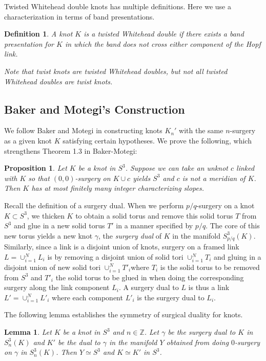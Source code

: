 \documentclass[11pt,usenames,dvipsnames,reqno]{amsart}
\numberwithin{theorem}{section}
\newtheorem{lemma}[theorem]{Lemma}
\newtheorem{proposition}[theorem]{Proposition}
\theoremstyle{ex}
\newtheorem{definition}[theorem]{Definition}
\theoremstyle{rem}
\begin{document}
Twisted Whitehead double knots has multiple definitions. Here we use a characterization in terms of band presentations.

\begin{definition} A knot $K$ is a \textit{twisted Whitehead double} if there exists a band presentation for $K$ in which the band does not cross either component of the Hopf link.
	
Note that twist knots are twisted Whitehead doubles, but not all twisted Whitehead doubles are twist knots.

\end{definition}

\subsection{Baker and Motegi's Construction} We follow Baker and Motegi \cite{baker-motegi} in constructing knots $K_n'$ with the same $n$-surgery as a given knot $K$ satisfying certain hypotheses. We prove the following, which strengthens Theorem 1.3 in Baker-Motegi:

\begin{proposition}\label{prop 2.3}
	Let $K$ be a knot in $S^3$. Suppose we can take an unknot $c$ linked with $K$ so that $(0,0)$-surgery on $K\cup c$ yields $S^3$ and $c$ is not a meridian of $K$. Then $K$ has at most finitely many integer characterizing slopes.
\end{proposition}

Recall the definition of a surgery dual. When we perform $p/q$-surgery on a knot $K\subset S^3$, we thicken $K$ to obtain a solid torus and remove this solid torus $T$ from $S^3$ and glue in a new solid torus $T'$ in a manner specified by $p/q$. The core of this new torus yields a new knot $\gamma$, the \textit{surgery dual} of $K$ in the manifold $S^3_{p/q}(K)$. Similarly, since a link is a disjoint union of knots, surgery on a framed link $L =\cup^{N}_{i=1} L_i$ is by removing a disjoint union of solid tori $\cup^{N}_{i=1} T_i$ and gluing in a disjoint union of new solid tori $\cup^{N}_{i=1} T'_i$where $T_i$ is the solid torus to be removed from $S^3$ and $T'_i$ the solid torus to be glued in when doing the corresponding surgery along the link component $L_i$. A surgery dual to $L$ is thus a link $L' = \cup^{N}_{i=1} L'_i$ where each component $L'_i$ is the surgery dual to $L_i$.

The following lemma establishes the symmetry of surgical duality for knots.

\begin{lemma}
	Let $K$ be a knot in $S^3$ and $n\in\mathbb{Z}$. Let $\gamma$ be the surgery dual to $K$ in $S^3_n(K)$ and $K'$ be the dual to $\gamma$ in the manifold $Y$ obtained from doing $0$-surgery on $\gamma$ in $S^3_n(K)$. Then $Y\simeq S^3$ and $K\simeq K'$ in $S^3$.
\end{lemma}
\end{document}
